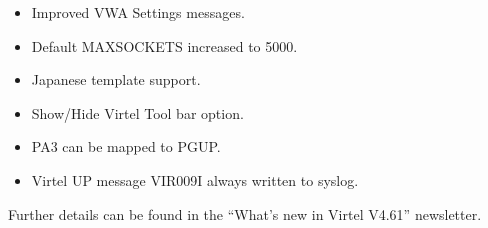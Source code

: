 \documentclass[letterpaper,10pt,english]{sphinxmanual}
\begin{document}
\begin{itemize}
\item {} 
Improved VWA Settings messages.

\item {} 
Default MAXSOCKETS increased to 5000.

\item {} 
Japanese template support.

\item {} 
Show/Hide Virtel Tool bar option.

\item {} 
PA3 can be mapped to PGUP.

\item {} 
Virtel UP message VIR009I always written to syslog.

\end{itemize}

Further details can be found in the “What’s new in Virtel V4.61” newsletter.



\renewcommand{\indexname}{Index}
\printindex
\end{document}
